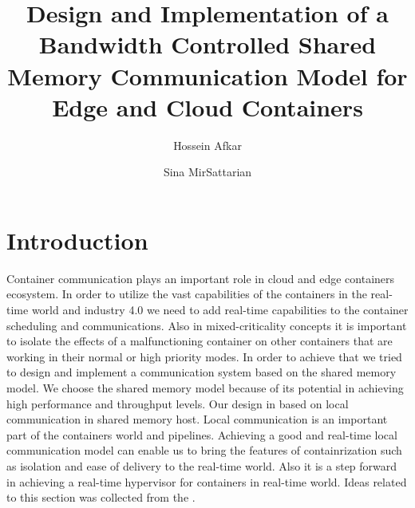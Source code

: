 \documentclass[a4paper, 10pt]{article}
\title{Design and Implementation of a Bandwidth
Controlled Shared Memory Communication Model for Edge and Cloud Containers}
\author{Hossein Afkar \and Sina MirSattarian}
\theoremstyle{nonumberplain}
\begin{document}
\maketitle

\section{Introduction}
Container communication plays an important role in cloud and edge containers
ecosystem. In order to utilize the vast capabilities of the containers in the
real-time world and industry 4.0 we need to add real-time capabilities to the
container scheduling and communications. Also in mixed-criticality concepts it
is important to isolate the effects of a malfunctioning container on other
containers that are working in their normal or high priority modes. In order
to achieve that we tried to design and implement a communication system based
on the shared memory model. We choose the shared memory model because of its
potential in achieving high performance and throughput levels. Our design in
based on local communication in shared memory host. Local communication is
an important part of the containers world and pipelines. Achieving a good
and real-time local communication model can enable us to bring the features of
containrization such as isolation and ease of delivery to the real-time world.
Also it is a step forward in achieving a real-time hypervisor for containers in
real-time world. Ideas related to this section was collected from the
\cite{survey}.
\end{document}

